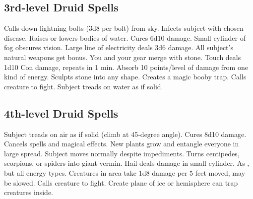 \subsection{3rd-level Druid Spells}
\begin{spelllist}
   Calls down lightning bolts (3d8 per bolt) from sky.
   Infects subject with chosen disease.
   Raises or lowers bodies of water.
   Cures 6d10 damage.
   Small cylinder of fog obscures vision.
   Large line of electricity deals 3d6 damage.
   All subject's natural weapons get  bonus.
   You and your gear merge with stone.
   Touch deals 1d10 Con damage, repeats in 1 min.
   Absorb 10 points/level of damage from one kind of energy.
   Sculpts stone into any shape.
   Creates a magic booby trap.
   Calls creature to fight.
   Subject treads on water as if solid.
\end{spelllist}

\subsection{4th-level Druid Spells}
\begin{spelllist}
   Subject treads on air as if solid (climb at 45-degree angle).
   Cures 8d10 damage.
   Cancels spells and magical effects.
   New plants grow and entangle everyone in large spread.
   Subject moves normally despite impediments.
   Turns centipedes, scorpions, or spiders into giant vermin.
   Hail deals damage in small cylinder.
   As , but all energy types.
   Creatures in area take 1d8 damage per 5 feet moved, may be slowed.
   Calls creature to fight.
   Create plane of ice or hemisphere can trap creatures inside.
\end{spelllist}


